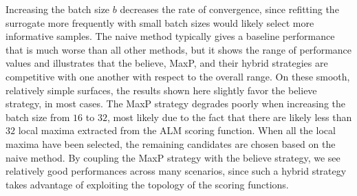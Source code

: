 Increasing the batch size $b$ decreases the rate of convergence, since refitting the surrogate more frequently with small batch sizes would likely select more informative samples.
%
The naive method typically gives a baseline performance that is much worse than all other methods, but it shows the range of performance values and illustrates that the believe, MaxP, and their hybrid strategies are competitive with one another with respect to the overall range.
%
On these smooth, relatively simple surfaces, the results shown here slightly favor the believe strategy, in most cases.
%
The MaxP strategy degrades poorly when increasing the batch size from $16$ to $32$, most likely due to the fact that there are likely less than $32$ local maxima extracted from the ALM scoring function.
%
When all the local maxima have been selected, the remaining candidates are chosen based on the naive method.
%
By coupling the MaxP strategy with the believe strategy, we see relatively good performances across many scenarios, since such a hybrid strategy takes advantage of exploiting the topology of the scoring functions.

